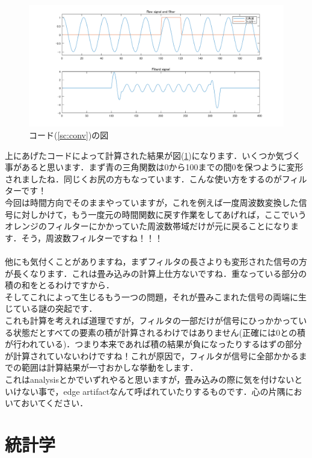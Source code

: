 \documentclass[11pt,a4paper,uplatex]{ujreport}
\begin{document}
\begin{figure}[H]
\label{im:conv2}
  \centering
  \includegraphics[width=300mm,bb=0 0 1400 400]{../figures/conv.png}
  \caption{コード(\ref{sc:conv})の図}
\end{figure}

上にあげたコードによって計算された結果が図(\ref{im:conv2})になります．いくつか気づく事があると思います．まず青の三角関数は0から100までの間0を保つように変形されましたね．同じくお尻の方もなっています．こんな使い方をするのがフィルターです！\\
今回は時間方向でそのままやっていますが，これを例えば一度周波数変換した信号に対しかけて，もう一度元の時間関数に戻す作業をしてあげれば，ここでいうオレンジのフィルターにかかっていた周波数帯域だけが元に戻ることになります．そう，周波数フィルターですね！！！\\
\\
他にも気付くことがありますね，まずフィルタの長さよりも変形された信号の方が長くなります．これは畳み込みの計算上仕方ないですね．重なっている部分の積の和をとるわけですから．\\
そしてこれによって生じるもう一つの問題，それが畳みこまれた信号の両端に生じている謎の突起です．\\
これも計算を考えれば道理ですが，フィルタの一部だけが信号にひっかかっている状態だとすべての要素の積が計算されるわけではありません(正確には0との積が行われている)．つまり本来であれば積の結果が負になったりするはずの部分が計算されていないわけですね！これが原因で，フィルタが信号に全部かかるまでの範囲は計算結果が一寸おかしな挙動をします．\\
これはanalysisとかでいずれやると思いますが，畳み込みの際に気を付けないといけない事で，edge artifactなんて呼ばれていたりするものです．心の片隅においておいてください．


\chapter{統計学}
\end{document}
